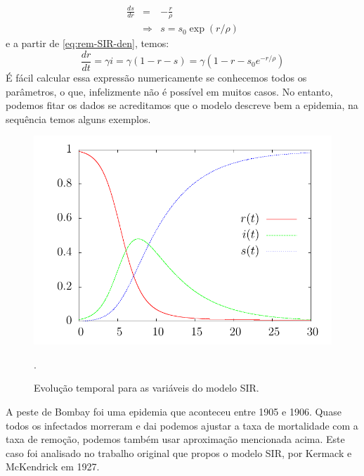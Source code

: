 \documentclass[a4paper,11pt]{report}
\begin{document}
\begin{eqnarray}
\frac{ds}{dr}&=&-\frac{r}{\rho}\nonumber \\
&\Rightarrow&s=s_0\exp(r/\rho)
\end{eqnarray}
e a partir de \ref{eq:rem-SIR-den}, temos:
\begin{equation}
\frac{dr}{dt}=\gamma i=\gamma(1-r-s)=\gamma(1-r-s_0 e^{-r/\rho})
\end{equation}  
\'E f\'acil calcular essa express\~ao numericamente se conhecemos todos os par\^ametros, o que, infelizmente n\~ao \'e poss\'ivel em muitos casos. No entanto, podemos fitar os dados se acreditamos que o modelo descreve bem a epidemia, na sequ\^encia temos alguns exemplos.

\begin{figure}[ht!]
\begin{center}
\includegraphics[scale=0.8]{./images/SIR-evolution.pdf}
\end{center}
\caption{Evolu\c{c}\~ao temporal para as vari\'aveis do modelo SIR.}.
\label{fig:SIR-evolution}
\end{figure}


A peste de Bombay foi uma epidemia que aconteceu entre 1905 e 1906. Quase todos os infectados morreram e dai podemos ajustar a taxa de mortalidade com a taxa de remo\c{c}\~ao, podemos tamb\'em usar aproxima\c{c}\~ao mencionada acima. Este caso foi analisado no trabalho original que propos o modelo SIR, por Kermack e McKendrick em 1927. 
\end{document}
